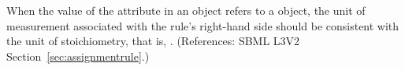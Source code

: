 When the value of the attribute  in an \AssignmentRule
object refers to a \SpeciesReference object, the unit of measurement
associated with the rule's right-hand side should be consistent with the
unit of stoichiometry, that is, .  (References: SBML
L3V2 Section~\ref{sec:assignmentrule}.)
